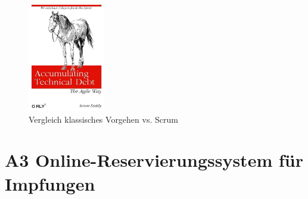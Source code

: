 \documentclass[12pt]{article}
\begin{document}
\begin{figure}[H]
    \centering
    \includegraphics[width=0.3\textwidth]{technical_dept.jpeg}
    \caption{Vergleich klassisches Vorgehen vs. Scrum}
\end{figure}

\newpage
\section*{A3 Online-Reservierungssystem für Impfungen}
\renewcommand{\PlantUMLJobname}{swt-a3}
\end{document}
